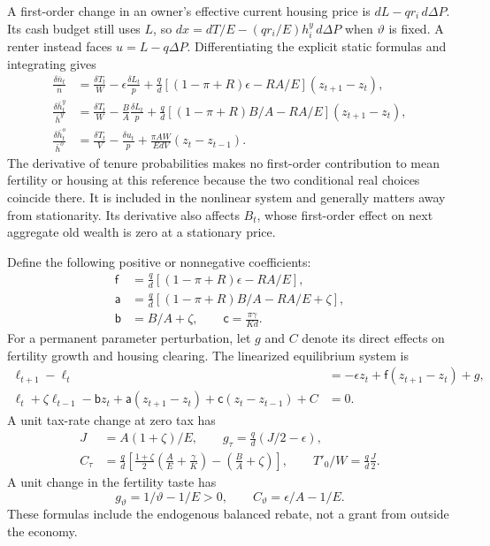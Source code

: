 \documentclass[11pt]{article}
\newcommand{\tht}{\vartheta}
\begin{document}
A first-order change in an owner's effective current housing price is
$dL-q r_i\,d\Delta P$. Its cash budget still uses $L$, so
$dx= dT/E-(q r_i/E)h_i^y\,d\Delta P$ when $\tht$ is fixed. A renter instead faces $u=L-q\Delta P$. Differentiating the explicit static formulas and integrating gives
\begin{align}
 \frac{\delta\bar n_t}{\bar n}
 &=\frac{\delta T_t}{W}-\epsilon\frac{\delta L_t}{p}
 +\frac qd[(1-\pi+R)\epsilon-RA/E](z_{t+1}-z_t),\label{eq:linfert}\\
 \frac{\delta\bar h_t^y}{\bar h^y}
 &=\frac{\delta T_t}{W}-\frac BA\frac{\delta L_t}{p}
 +\frac qd[(1-\pi+R)B/A-RA/E](z_{t+1}-z_t),\label{eq:linhy}\\
 \frac{\delta\bar h_t^o}{\bar h^o}
 &=\frac{\delta T_t}{V}-\frac{\delta u_t}{p}
 +\frac{\pi A W}{EdV}(z_t-z_{t-1}).\label{eq:linho}
\end{align}
The derivative of tenure probabilities makes no first-order contribution to mean fertility or housing at this reference because the two conditional real choices coincide there. It is included in the nonlinear system and generally matters away from stationarity. Its derivative also affects $B_t$, whose first-order effect on next aggregate old wealth is zero at a stationary price.

Define the following positive or nonnegative coefficients:
\begin{equation}
\begin{split}
 \mathsf f&=\frac qd[(1-\pi+R)\epsilon-RA/E],\\
 \mathsf a&=\frac qd[(1-\pi+R)B/A-RA/E+\zeta],\\
 \mathsf b&=B/A+\zeta,\qquad
 \mathsf c=\frac{\pi\gamma}{Kd}.
\end{split}\label{eq:abcdynamic}
\end{equation}
For a permanent parameter perturbation, let $g$ and $C$ denote its direct effects on fertility growth and housing clearing. The linearized equilibrium system is
\begin{align}
 \ell_{t+1}-\ell_t&=-\epsilon z_t+\mathsf f(z_{t+1}-z_t)+g,\label{eq:lindemog}\\
 \ell_t+\zeta\ell_{t-1}-\mathsf b z_t
 +\mathsf a(z_{t+1}-z_t)+\mathsf c(z_t-z_{t-1})+C&=0.\label{eq:linhousing}
\end{align}
A unit tax-rate change at zero tax has
\begin{equation}
\begin{split}
 J&=A(1+\zeta)/E,\qquad
 g_\tau=\frac qd(J/2-\epsilon),\\
 C_\tau&=\frac qd\left[\frac{1+\zeta}{2}\left(\frac AE+\frac\gamma K\right)
                         -\left(\frac BA+\zeta\right)\right],\qquad
 T'_0/W=\frac qd\frac J2.
\end{split}\label{eq:taxforcing}
\end{equation}
A unit change in the fertility taste has
\begin{equation}
 g_{\tht}=1/\tht-1/E>0,\qquad C_{\tht}=\epsilon/A-1/E.\label{eq:tasteforcing}
\end{equation}
These formulas include the endogenous balanced rebate, not a grant from outside the economy.
\end{document}
